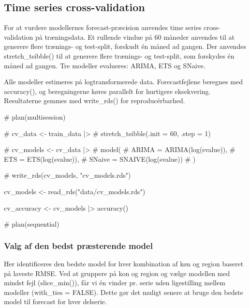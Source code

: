 \documentclass[
]{article}
\newenvironment{Shaded}{\begin{snugshade}}{\end{snugshade}}
\newcommand{\CommentTok}[1]{\textcolor[rgb]{0.37,0.37,0.37}{#1}}
\newcommand{\FunctionTok}[1]{\textcolor[rgb]{0.28,0.35,0.67}{#1}}
\newcommand{\NormalTok}[1]{\textcolor[rgb]{0.00,0.23,0.31}{#1}}
\newcommand{\OtherTok}[1]{\textcolor[rgb]{0.00,0.23,0.31}{#1}}
\newcommand{\SpecialCharTok}[1]{\textcolor[rgb]{0.37,0.37,0.37}{#1}}
\newcommand{\StringTok}[1]{\textcolor[rgb]{0.13,0.47,0.30}{#1}}
\begin{document}
\subsection{Time series
cross-validation}\label{time-series-cross-validation}

For at vurdere modellernes forecast-præcision anvendes time series
cross-validation på træningsdata. Et rullende vindue på 60 måneder
anvendes til at generere flere trænings- og test-split, forskudt én
måned ad gangen. Der anvendes stretch\_tsibble() til at generere flere
trænings- og test-split, som forskydes én måned ad gangen. Tre modeller
evalueres: ARIMA, ETS og SNaive.

Alle modeller estimeres på logtransformerede data. Forecastfejlene
beregnes med accuracy(), og beregningerne køres parallelt for hurtigere
eksekvering. Resultaterne gemmes med write\_rds() for reproducérbarhed.

\begin{Shaded}
\begin{Highlighting}[]
\CommentTok{\# plan(multisession)}

\CommentTok{\# cv\_data \textless{}{-} train\_data |\textgreater{}}
\CommentTok{\#   stretch\_tsibble(.init = 60, .step = 1)}

\CommentTok{\# cv\_models \textless{}{-} cv\_data |\textgreater{}}
\CommentTok{\#   model(}
\CommentTok{\#     ARIMA  = ARIMA(log(svalue)),}
\CommentTok{\#     ETS    = ETS(log(svalue)),}
\CommentTok{\#     SNaive = SNAIVE(log(svalue))}
\CommentTok{\#   )}

\CommentTok{\# write\_rds(cv\_models, "cv\_models.rds")}

\NormalTok{cv\_models }\OtherTok{\textless{}{-}} \FunctionTok{read\_rds}\NormalTok{(}\StringTok{"data/cv\_models.rds"}\NormalTok{)}

\NormalTok{cv\_accuracy }\OtherTok{\textless{}{-}}\NormalTok{ cv\_models }\SpecialCharTok{|\textgreater{}}
  \FunctionTok{accuracy}\NormalTok{()}

\CommentTok{\# plan(sequential)}
\end{Highlighting}
\end{Shaded}

\subsubsection{Valg af den bedst præsterende
model}\label{valg-af-den-bedst-pruxe6sterende-model}

Her identificeres den bedste model for hver kombination af køn og region
baseret på laveste RMSE. Ved at gruppere på kon og region og vælge
modellen med mindst fejl (slice\_min()), får vi én vinder pr. serie uden
ligestilling mellem modeller (with\_ties = FALSE). Dette gør det muligt
senere at bruge den bedste model til forecast for hver delserie.
\end{document}
